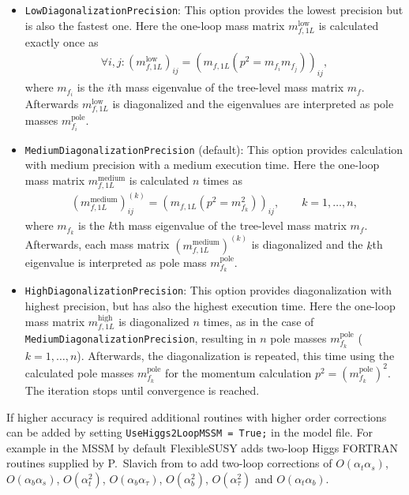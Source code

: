 \documentclass[final,3p,11pt,pdflatex]{elsarticle}
\newcommand{\fs}{FlexibleSUSY\xspace}
\newcommand{\code}[1]{\lstinline|#1|}  %
\newcommand{\pole}{\text{pole}}
\def\at{\alpha_t}
\def\ab{\alpha_b}
\def\as{\alpha_s}
\def\atau{\alpha_{\tau}}
\def\oatab{O(\at\ab)}
\def\oatas{O(\at\as)}
\def\oabas{O(\ab\as)}
\def\oatq{O(\at^2)}
\def\oabq{O(\ab^2)}
\def\oatauq{O(\atau^2)}
\def\oabatau{O(\ab \atau)}
\begin{document}
\begin{itemize}
\item \code{LowDiagonalizationPrecision}: This option provides the
  lowest precision but is also the fastest one.  Here the one-loop
  mass matrix $m_{f,1L}^\text{low}$ is calculated exactly once as
%
  \begin{align}
    \forall i,j: (m_{f,1L}^\text{low})_{ij} = (m_{f,1L}(p^2 = m_{f_i}
    m_{f_j}))_{ij} ,
  \end{align}
%
  where $m_{f_i}$ is the $i$th mass eigenvalue of the tree-level mass
  matrix $m_f$.  Afterwards $m_{f,1L}^\text{low}$ is diagonalized and
  the eigenvalues are interpreted as pole masses $m_{f_i}^\pole$.

\item \code{MediumDiagonalizationPrecision} (default): This option
  provides calculation with medium precision with a medium execution
  time.  Here the one-loop mass matrix $m_{f,1L}^\text{medium}$ is
  calculated $n$ times as
%
  \begin{align}
    (m_{f,1L}^\text{medium})_{ij}^{(k)} = (m_{f,1L}(p^2 =
    m_{f_k}^2))_{ij} , \qquad k = 1,\ldots,n ,
  \end{align}
%
  where $m_{f_k}$ is the $k$th mass eigenvalue of the tree-level mass
  matrix $m_f$.  Afterwards, each mass matrix
  $(m_{f,1L}^\text{medium})^{(k)}$ is diagonalized and the $k$th
  eigenvalue is interpreted as pole mass $m_{f_k}^\pole$.

\item \code{HighDiagonalizationPrecision}: This option provides
  diagonalization with highest precision, but has also the highest
  execution time.  Here the one-loop mass matrix
  $m_{f,1L}^\text{high}$ is diagonalized $n$ times, as in the case of
  \code{MediumDiagonalizationPrecision}, resulting in $n$ pole masses
  $m_{f_k}^\pole$ ($k = 1,\ldots,n$).  Afterwards, the diagonalization
  is repeated, this time using the calculated pole masses
  $m_{f_k}^\pole$ for the momentum calculation $p^2 =
  (m_{f_k}^\pole)^2$.  The iteration stops until convergence is
  reached.
\end{itemize}

If higher accuracy is required additional routines with higher order
corrections can be added by setting \code{UseHiggs2LoopMSSM = True;}
in the model file. For example in the MSSM by default \fs adds
two-loop Higgs FORTRAN routines supplied by P.~Slavich from
\cite{Degrassi:2001yf,Brignole:2001jy,Dedes:2002dy,Brignole:2002bz,Dedes:2003km}
to add two-loop corrections of $\oatas$, $\oabas$, $\oatq$,
$\oabatau$, $\oabq$, $\oatauq$ and $\oatab$.
\end{document}
